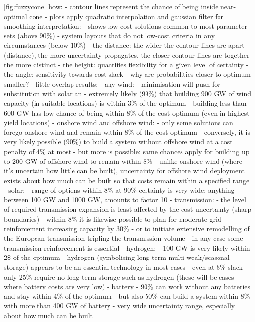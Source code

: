 \cref{fig:fuzzycone}
how:
- contour lines represent the chance of being inside near-optimal cone
- plots apply quadratic interpolation and gaussian filter for smoothing
interpretation:
- shows low-cost solutions common to most parameter sets (above 90\%)
- system layouts that do not low-cost criteria in any circumstances (below 10\%)
- the distance: the wider the contour lines are apart (distance), the more uncertainty propagates, the closer contour lines are together the more distinct
- the height: quantifies flexibility for a given level of certainty
- the angle: sensitivity towards cost slack
- why are probabilities closer to optimum smaller? - little overlap
results:
- any wind:
  - minimisation will push for substitution with solar an
  - extremely likely (99\%) that building 900 GW of wind capacity (in suitable locations) is within 3\% of the optimum
  - building less than 600 GW has low chance of being within 8\% of the cost optimum (even in highest yield locations)
- onshore wind and offshore wind:
  - only some solutions can forego onshore wind and remain within 8\% of the cost-optimum
  - conversely, it is very likely possible (90\%) to build a system without offshore wind at a cost penalty of 4\% at most
  - but more is possible: same chances apply for building up to 200 GW of offshore wind to remain within 8\% 
  - unlike onshore wind (where it's uncertain how little can be built), uncertainty for offshore wind deployment exists about
    how much can be built so that costs remain within a specified range
- solar:
  - range of options within 8\% at 90\% certainty is very wide: anything between 100 GW and 1000 GW, amounts to factor 10
- transmission: 
  - the level of required transmission expansion is least affected by the cost uncertainty (sharp boundaries)
  - within 8\% it is likewise possible to plan for moderate grid reinforcement increasing capacity by 30\%
  - or to initiate extensive remodelling of the European transmission tripling the transmission volume
  - in any case some transmission reinforcement is essential 
- hydrogen:
  - 100 GW is very likely within 2\$ of the optimum
  - hydrogen (symbolising long-term multi-weak/seasonal storage) appears to be an essential technology in most cases
  - even at 8\% slack only 25\% require no long-term storage such as hydrogen (these will be cases where battery costs are very low)
- battery
  - 90\% can work without any batteries and stay within 4\% of the optimum
  - but also 50\% can build a system within 8\% with more than 400 GW of battery
  - very wide uncertainty range, especially about how much can be built

